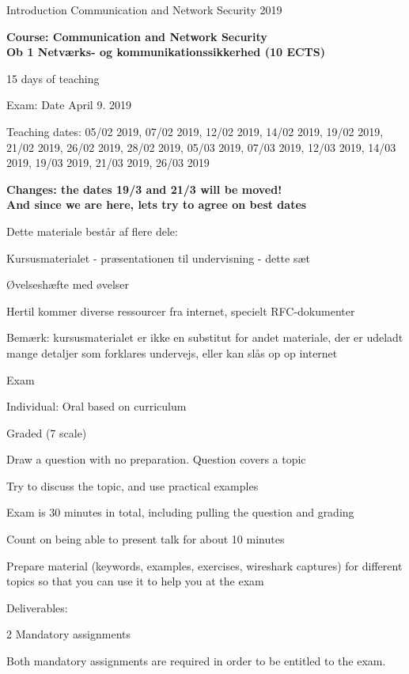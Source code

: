\documentclass[Screen16to9,17pt]{foils}
\begin{document}
\mytitlepage
{Introduction}
{Communication and Network Security 2019}

\hlkprofiluk


{\Large\bf Course: Communication and Network Security\\
Ob 1 Netværks- og kommunikationssikkerhed (10 ECTS)}

15 days of teaching

Exam:
Date April 9. 2019

Teaching dates: 05/02 2019, 07/02 2019, 12/02 2019, 14/02 2019, 19/02 2019, 21/02 2019, 26/02 2019, 28/02 2019, 05/03 2019, 07/03 2019, 12/03 2019, 14/03 2019, 19/03 2019, 21/03 2019, 26/03 2019

{\bf Changes: the dates 19/3 and 21/3 will be moved!\\
And since we are here, lets try to agree on best dates}



\begin{list1}
\item Dette materiale består af flere dele:
\begin{list2}
\item Kursusmaterialet - præsentationen til undervisning - dette sæt
\item Øvelseshæfte med øvelser
\end{list2}
\item Hertil kommer diverse ressourcer fra internet, specielt RFC-dokumenter
\item Bemærk: kursusmaterialet er ikke en substitut for andet materiale, der er udeladt mange detaljer som forklares undervejs, eller kan slås op op internet
\end{list1}



\begin{list2}
\item Exam
\item Individual: Oral based on curriculum
\item Graded (7 scale)
\item Draw a question with no preparation. Question covers a topic
\item Try to discuss the topic, and use practical examples
\item Exam is 30 minutes in total, including pulling the question and grading
\item Count on being able to present talk for about 10 minutes
\item Prepare material (keywords, examples, exercises, wireshark captures) for different topics so that you can use it to help you at the exam

\vskip 5mm
\item Deliverables:
\item 2 Mandatory assignments
\item Both mandatory assignments are required in order to be entitled to the exam.
\end{list2}
\end{document}
